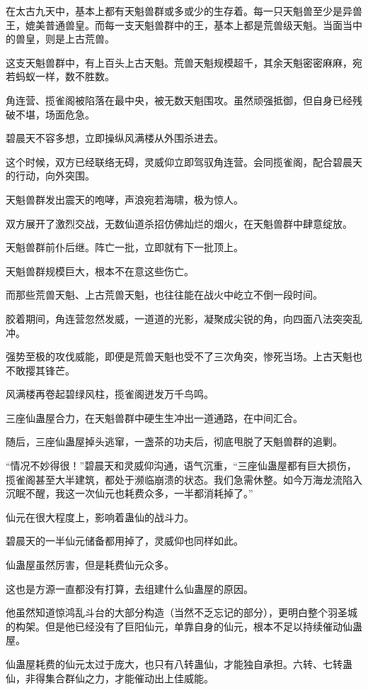 \begin{this_body}
在太古九天中，基本上都有天魁兽群或多或少的生存着。每一只天魁兽至少是异兽王，媲美普通兽皇。而每一支天魁兽群中的王，基本上都是荒兽级天魁。当面当中的兽皇，则是上古荒兽。

这支天魁兽群中，有上百头上古天魁。荒兽天魁规模超千，其余天魁密密麻麻，宛若蚂蚁一样，数不胜数。

角连营、揽雀阁被陷落在最中央，被无数天魁围攻。虽然顽强抵御，但自身已经残破不堪，场面危急。

碧晨天不容多想，立即操纵风满楼从外围杀进去。

这个时候，双方已经联络无碍，灵威仰立即驾驭角连营。会同揽雀阁，配合碧晨天的行动，向外突围。

天魁兽群发出震天的咆哮，声浪宛若海啸，极为惊人。

双方展开了激烈交战，无数仙道杀招仿佛灿烂的烟火，在天魁兽群中肆意绽放。

天魁兽群前仆后继。阵亡一批，立即就有下一批顶上。

天魁兽群规模巨大，根本不在意这些伤亡。

而那些荒兽天魁、上古荒兽天魁，也往往能在战火中屹立不倒一段时间。

胶着期间，角连营忽然发威，一道道的光影，凝聚成尖锐的角，向四面八法突突乱冲。

强势至极的攻伐威能，即便是荒兽天魁也受不了三次角突，惨死当场。上古天魁也不敢撄其锋芒。

风满楼再卷起碧绿风柱，揽雀阁迸发万千鸟鸣。

三座仙蛊屋合力，在天魁兽群中硬生生冲出一道通路，在中间汇合。

随后，三座仙蛊屋掉头逃窜，一盏茶的功夫后，彻底甩脱了天魁兽群的追剿。

“情况不妙得很！”碧晨天和灵威仰沟通，语气沉重，“三座仙蛊屋都有巨大损伤，揽雀阁甚至大半建筑，都处于濒临崩溃的状态。我们急需休整。如今万海龙流陷入沉眠不醒，我这一次仙元也耗费众多，一半都消耗掉了。”

仙元在很大程度上，影响着蛊仙的战斗力。

碧晨天的一半仙元储备都用掉了，灵威仰也同样如此。

仙蛊屋虽然厉害，但是耗费仙元众多。

这也是方源一直都没有打算，去组建什么仙蛊屋的原因。

他虽然知道惊鸿乱斗台的大部分构造（当然不乏忘记的部分），更明白整个羽圣城的构架。但是他已经没有了巨阳仙元，单靠自身的仙元，根本不足以持续催动仙蛊屋。

仙蛊屋耗费的仙元太过于庞大，也只有八转蛊仙，才能独自承担。六转、七转蛊仙，非得集合群仙之力，才能催动出上佳威能。


\end{this_body}
